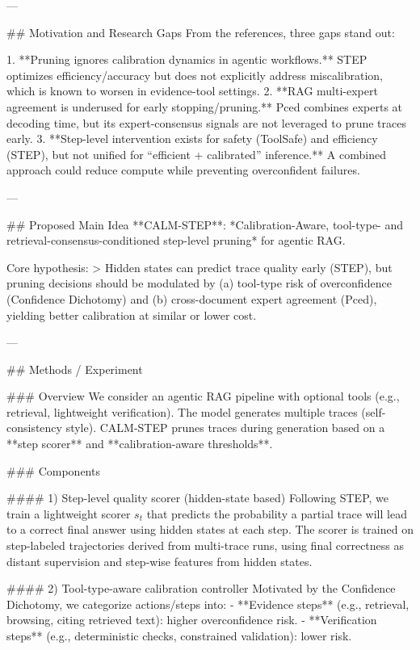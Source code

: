 ---

## Motivation and Research Gaps  
From the references, three gaps stand out:

1. **Pruning ignores calibration dynamics in agentic workflows.** STEP optimizes efficiency/accuracy but does not explicitly address miscalibration, which is known to worsen in evidence-tool settings.  
2. **RAG multi-expert agreement is underused for early stopping/pruning.** Pced combines experts at decoding time, but its expert-consensus signals are not leveraged to prune traces early.  
3. **Step-level intervention exists for safety (ToolSafe) and efficiency (STEP), but not unified for “efficient + calibrated” inference.** A combined approach could reduce compute while preventing overconfident failures.

---

## Proposed Main Idea  
**CALM-STEP**: *Calibration-Aware, tool-type- and retrieval-consensus-conditioned step-level pruning* for agentic RAG.

Core hypothesis:  
> Hidden states can predict trace quality early (STEP), but pruning decisions should be modulated by (a) tool-type risk of overconfidence (Confidence Dichotomy) and (b) cross-document expert agreement (Pced), yielding better calibration at similar or lower cost.

---

## Methods / Experiment  

### Overview  
We consider an agentic RAG pipeline with optional tools (e.g., retrieval, lightweight verification). The model generates multiple traces (self-consistency style). CALM-STEP prunes traces during generation based on a **step scorer** and **calibration-aware thresholds**.

### Components  

#### 1) Step-level quality scorer (hidden-state based)  
Following STEP, we train a lightweight scorer \( s_t \) that predicts the probability a partial trace will lead to a correct final answer using hidden states at each step. The scorer is trained on step-labeled trajectories derived from multi-trace runs, using final correctness as distant supervision and step-wise features from hidden states.

#### 2) Tool-type-aware calibration controller  
Motivated by the Confidence Dichotomy, we categorize actions/steps into:
- **Evidence steps** (e.g., retrieval, browsing, citing retrieved text): higher overconfidence risk.  
- **Verification steps** (e.g., deterministic checks, constrained validation): lower risk.

